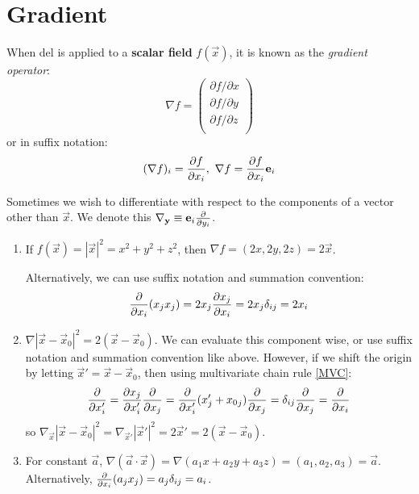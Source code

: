 \documentclass[../main.tex]{subfiles}
\begin{document}
\section{Gradient}
\label{secGrad}
\begin{definition}[Gradient]
  When del is applied to a \textbf{scalar field} $f(\vec{x})$, it is known as the \textit{gradient operator}:
  \[
    \nabla f = \begin{pmatrix}
    \partial f/\partial x \\
    \partial f/\partial y \\
    \partial f/\partial z \\
    \end{pmatrix}
  \]
  or in suffix notation:
  \[
    (\nabla f)_i = \pderiv{f}{x_i},\ \nabla f = \pderiv{f}{x_i}\vec{e}_i
  \]
\end{definition}
\begin{remark}[Notation]
  Sometimes we wish to differentiate with respect to the components of a vector other than $\vec{x}$.
  We denote this $\nabla_{\vec{y}} \equiv \vec{e}_i \pderiv{}{y_i}$.
\end{remark}
\begin{example}
  \label{gradExample}
  \begin{enumerate}
    \item If $f(\vec{x}) = |\vec{x}|^2 = x^2 + y^2 + z^2$, then $\nabla f = (2x, 2y, 2z) = 2\vec{x}$.

      Alternatively, we can use suffix notation and summation convention:
      \[
        \pderiv{}{x_i}(x_j x_j) = 2x_j \pderiv{x_j}{x_i} = 2x_j \delta_{i j} = 2x_i
      \]
    \item $\nabla |\vec{x} - \vec{x}_0|^2 = 2(\vec{x} - \vec{x}_0)$.
      We can evaluate this component wise, or use suffix notation and summation convention like above.
      However, if we shift the origin by letting $\vec{x}' = \vec{x} - \vec{x}_0$, then using multivariate chain rule \cref{MVC}:
      \[
        \pderiv{}{x_i'} = \pderiv{x_j}{x_i'} \pderiv{}{x_j} = \pderiv{}{x_i'}(x'_j + {x_0}_j) \pderiv{}{x_j} = \delta_{i j} \pderiv{}{x_j} = \pderiv{}{x_i}
      \]
      so $\nabla_{\vec{x}} |\vec{x} - \vec{x}_0|^2 = \nabla_{\vec{x}'} |\vec{x}'|^2 = 2\vec{x}' = 2(\vec{x} - \vec{x}_0)$.
    \item For constant $\vec{a}$, $\nabla(\vec{a} \cdot \vec{x}) = \nabla(a_1 x + a_2 y + a_3 z) = (a_1, a_2, a_3) = \vec{a}$.
      Alternatively, $\pderiv{ }{x_i} (a_j x_j) = a_j \delta_{i j} = a_i$.
  \end{enumerate}
\end{example}
\end{document}

